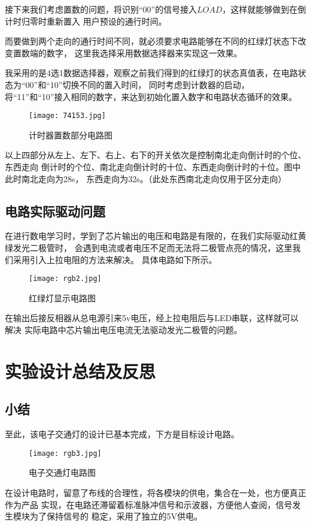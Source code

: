 \documentclass[AutoFakeBold]{LZUThesis}
\begin{document}
接下来我们考虑置数的问题，将识别“00”的信号接入$\overline{LOAD}$，这样就能够做到在倒计时归零时重新置入
用户预设的通行时间。

而要做到两个走向的通行时间不同，就必须要求电路能够在不同的红绿灯状态下改变置数端的数字，
这里我选择采用数据选择器来实现这一效果。

我采用的是4选1数据选择器，观察之前我们得到的红绿灯的状态真值表，在电路状态为“00”和“10”切换不同的置入时间，
同时考虑到计数器的启动，将“11”和“10”接入相同的数字，来达到初始化置入数字和电路状态循环的效果。

\begin{figure}[htbp]
    \centering
    \texttt{[image: 74153.jpg]}
    \caption{计时器置数部分电路图}
\end{figure}
以上四部分从左上、左下、右上、右下的开关依次是控制南北走向倒计时的个位、东西走向
倒计时的个位、南北走向倒计时的十位、东西走向倒计时的十位。图中此时南北走向为28s，
东西走向为32s。（此处东西南北走向仅用于区分走向）
\section{电路实际驱动问题}
在进行数电学习时，学到了芯片输出的电压和电路是有限的，在我们实际驱动红黄绿发光二极管时，
会遇到电流或者电压不足而无法将二极管点亮的情况，这里我们采用引入上拉电阻的方法来解决。
具体电路如下所示。

\begin{figure}[htbp]
    \centering
    \texttt{[image: rgb2.jpg]}
    \caption{红绿灯显示电路图}
\end{figure}

在输出后接反相器从总电源引来5v电压，经上拉电阻后与LED串联，这样就可以解决
实际电路中芯片输出电压电流无法驱动发光二极管的问题。

\chapter{实验设计总结及反思}
\section{小结}
至此，该电子交通灯的设计已基本完成，下方是目标设计电路。

\begin{figure}[htbp]
    \centering
    \texttt{[image: rgb3.jpg]}
    \caption{电子交通灯电路图}
\end{figure}
在设计电路时，留意了布线的合理性，将各模块的供电，集合在一处，也方便真正作为产品
实现，在电路还滞留着标准脉冲信号和示波器，方便他人查阅，信号发生模块为了保持信号的
稳定，采用了独立的5V供电。
\end{document}
